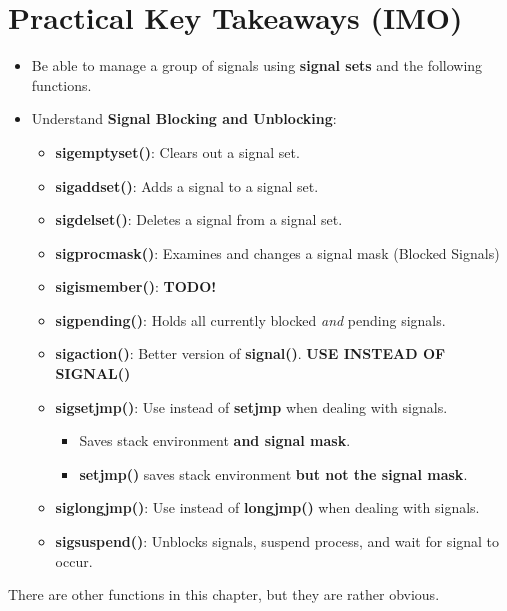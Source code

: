 \documentclass{article}
\begin{document}
\section{Practical Key Takeaways (IMO)}
\begin{itemize}
    \item Be able to manage a group of signals using \textbf{signal sets} and the following functions.
    \item Understand \textbf{Signal Blocking and Unblocking}:
        \begin{itemize}
            \item \textbf{sigemptyset()}: Clears out a signal set.
            \item \textbf{sigaddset()}: Adds a signal to a signal set.
            \item \textbf{sigdelset()}: Deletes a signal from a signal set.
            \item \textbf{sigprocmask()}: Examines and changes a signal mask (Blocked Signals)
            \item \textbf{sigismember()}: \textbf{TODO!}
            \item \textbf{sigpending()}: Holds all currently blocked \emph{and} pending signals.
            \item \textbf{sigaction()}: Better version of \textbf{signal()}. \textbf{USE INSTEAD OF SIGNAL()}
            \item \textbf{sigsetjmp()}: Use instead of \textbf{setjmp} when dealing with signals.
                \begin{itemize}
                    \item Saves stack environment \textbf{and signal mask}.
                    \item \textbf{setjmp()} saves stack environment \textbf{but not the signal mask}.
                \end{itemize}
            \item \textbf{siglongjmp()}: Use instead of \textbf{longjmp()} when dealing with signals.
            \item \textbf{sigsuspend()}: Unblocks signals, suspend process, and wait for signal to occur.
        \end{itemize}
\end{itemize}
There are other functions in this chapter, but they are rather obvious.
\end{document}
